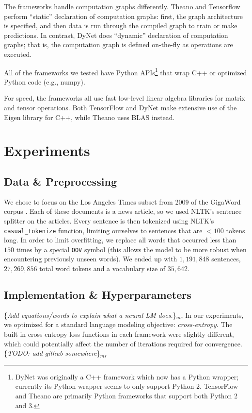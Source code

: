 \documentclass{article}
\newcommand{\ms}[1]{{\color{cyan}\{\textit{#1}\}$_{ms}$}}
\begin{document}
The frameworks handle computation graphs differently. Theano and Tensorflow perform ``static'' declaration of computation graphs: first, the graph architecture is specified, and then data is run through the compiled graph to train or make predictions. In contrast, DyNet does ``dynamic'' declaration of computation graphs; that is, the computation graph is defined on-the-fly as operations are executed.

All of the frameworks we tested have Python APIs\footnote{DyNet was originally a C++ framework which now has a Python wrapper; currently its Python wrapper seems to only support Python 2. TensorFlow and Theano are primarily Python frameworks that support both Python 2 and 3.} that wrap C++ or optimized Python code (e.g., numpy).

For speed, the frameworks all use fast low-level linear algebra libraries for matrix and tensor operations. Both TensorFlow and DyNet make extensive use of the Eigen library for C++, while Theano uses BLAS instead.


\section{Experiments}
\subsection{Data \& Preprocessing}
We chose to focus on the Los Angeles Times subset from 2009 of the GigaWord corpus \cite{gigaword}. Each of these documents is a news article, so we used NLTK’s \cite{nltk} sentence splitter on the articles. Every sentence is then tokenized using NLTK’s \verb!casual_tokenize! function, limiting ourselves to sentences that are $<100$ tokens long. In order to limit overfitting, we replace all words that occurred less than $150$ times by a special \verb!OOV! symbol (this allows the model to be more robust when encountering previously unseen words). We ended up with $1,191,848$ sentences, $27,269,856$ total word tokens and a vocabulary size of $35,642$.

\subsection{Implementation \& Hyperparameters}
\ms{Add equations/words to explain what a neural LM does.}
In our experiments, we optimized for a standard language modeling objective: \textit{cross-entropy}. The built-in cross-entropy loss functions in each framework were slightly different, which could potentially affect the number of iterations required for convergence. \ms{TODO: add github somewhere}
\end{document}
